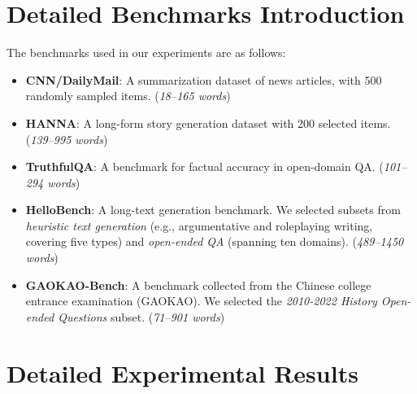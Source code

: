 \section{Detailed Benchmarks Introduction}
\vspace{-4pt}
\label{sec:bench_detail}
The benchmarks used in our experiments are as follows:
\vspace{-5pt}  
\begin{itemize}
    \setlength{\itemsep}{-2pt} %
    \item \textbf{CNN/DailyMail}\citep{CNN/DailyMail}: A summarization dataset of news articles, with 500 randomly sampled items. (\textit{18–165 words})
    \item \textbf{HANNA}\citep{HANNA}: A long-form story generation dataset with 200 selected items. (\textit{139–995 words})
    \item \textbf{TruthfulQA}\citep{TruthfulQA}: A benchmark for factual accuracy in open-domain QA. (\textit{101–294 words})
    \item \textbf{HelloBench}\citep{HelloBench}: A long-text generation benchmark. We selected subsets from \textit{heuristic text generation} (e.g., argumentative and roleplaying writing, covering five types) and \textit{open-ended QA} (spanning ten domains). (\textit{489–1450 words})
    \item \textbf{GAOKAO-Bench}\citep{gaokao}: A benchmark collected from the Chinese college entrance examination (GAOKAO). We selected the \textit{2010-2022 History Open-ended Questions} subset. (\textit{71–901 words})
\end{itemize}




\section{Detailed Experimental Results}
\label{sec:exp details}

